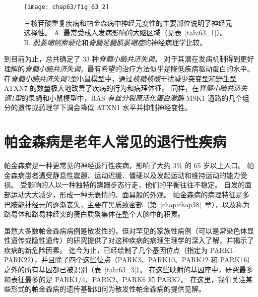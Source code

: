 \begin{figure}[htbp]
	\centering
	\texttt{[image: chap63/fig\_63\_2]}
	\caption{三核苷酸重复疾病和帕金森病中神经元变性的主要部位说明了神经元选择性。
		A. 最常受成人发病影响的大脑区域（见表~\ref{tab:63_1}）。
		B. \textit{肌萎缩侧索硬化}和\textit{脊髓延髓肌萎缩症}的神经病理学比较。}
	\label{fig:63_2}
\end{figure}


到目前为止，总共确定了 33 种\textit{脊髓小脑共济失调}。
对于其潜在发病机制得到更好理解的\textit{脊髓小脑共济失调}，最有希望的治疗方法似乎是降低疾病驱动蛋白的水平。
在\textit{脊髓小脑共济失调7型}小鼠模型中，通过\textit{核糖核酸}干扰减少突变型和野生型 ATXN7 的数量极大地改善了疾病的行为和病理体征。
同样，在\textit{脊髓小脑共济失调1型}的果蝇和小鼠模型中，RAS-\textit{有丝分裂原活化蛋白激酶}-MSK1 通路的几个组分的遗传或药理学下调会降低 ATXN1 水平并抑制神经变性。



\section{帕金森病是老年人常见的退行性疾病}

帕金森病是一种更常见的神经退行性疾病，影响了大约 3\% 的 65 岁以上人口。
帕金森病患者遭受静息性震颤、运动迟缓、僵硬以及发起运动和维持运动的能力受损。
受影响的人以一种独特的蹒跚步态行走，他们的平衡往往不稳定。
自发的面部运动大大减少，形成一种无表情的、面具般的外观。
帕金森病的病理特征是多巴胺能神经元的逐渐丧失，主要在黑质致密部（第~\ref{chap:chap38}~章），以及称为路易体和路易神经突的蛋白质聚集体在整个大脑中的积累。


虽然大多数帕金森病病例是散发性的，但对罕见的家族性病例（可以是常染色体显性遗传或隐性遗传）的研究提供了对这种疾病的病理生理学的深入了解，并揭示了疾病的新危险因素。
迄今为止，已经绘制了几个基因位点（指定为 PARK1–PARK22），并且除了四个这些位点（PARK3、PARK10、PARK12 和 PARK16）之外的所有基因都已被识别（表~\ref{tab:63_3}）。
在这些映射的基因座中，研究最多和表征最多的是 PARK1/4、PARK2、PARK6 和 PARK7。
在这里，我们关注某些形式的帕金森病的遗传基础如何为散发性帕金森病的提供见解。


